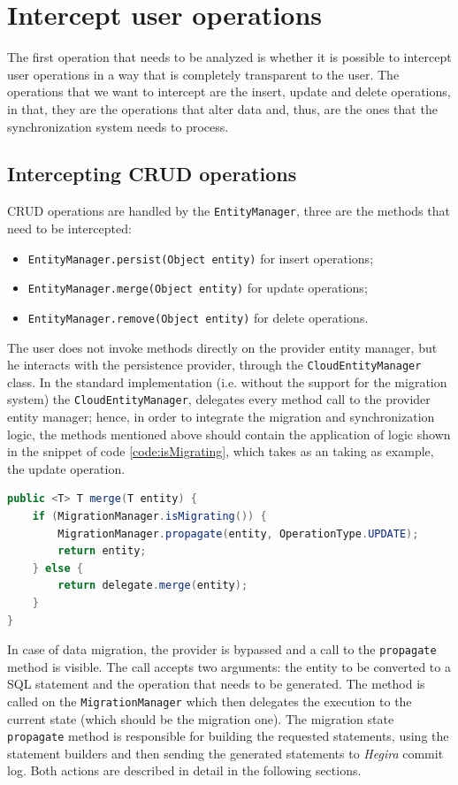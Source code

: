 \section{Intercept user operations}
The first operation that needs to be analyzed is whether it is possible to intercept user operations in a way that is completely transparent to the user.
The operations that we want to intercept are the insert, update and delete operations, in that, they are the operations that alter data and, thus, are the ones that the synchronization system needs to process.

\subsection{Intercepting CRUD operations}
CRUD operations are handled by the \texttt{EntityManager}, three are the methods that need to be intercepted:
\begin{itemize}
\item \texttt{EntityManager.persist(Object entity)} for insert operations;
\item \texttt{EntityManager.merge(Object entity)} for update operations;
\item \texttt{EntityManager.remove(Object entity)} for delete operations.
\end{itemize}
\noindent The user does not invoke methods directly on the provider entity manager, but he interacts with the persistence provider, through the \texttt{CloudEntityManager} class. In the standard implementation (i.e. without the support for the migration system) the \texttt{CloudEntityManager}, delegates every method call to the provider entity manager; hence, in order to integrate the  migration and synchronization logic, the methods mentioned above should contain the application of logic shown in the snippet of code \ref{code:isMigrating}, which takes as an taking as example, the update operation.

\begin{lstlisting}[language=Java, caption=Integrate migration logic, label=code:isMigrating]
public <T> T merge(T entity) {
    if (MigrationManager.isMigrating()) {
        MigrationManager.propagate(entity, OperationType.UPDATE);
        return entity;
    } else {
        return delegate.merge(entity);
    }
}
\end{lstlisting}

\noindent In case of data migration, the provider is bypassed and a call to the \texttt{propagate} method is visible. The call accepts two arguments: the entity to be converted to a SQL statement and the operation that needs to be generated. The method is called on the \texttt{MigrationManager} which then delegates the execution to the current state (which should be the migration one). The migration state \texttt{propagate} method is responsible for building the requested statements, using the statement builders and then sending the generated statements to \textit{Hegira} commit log. Both actions are described in detail in the following sections.

